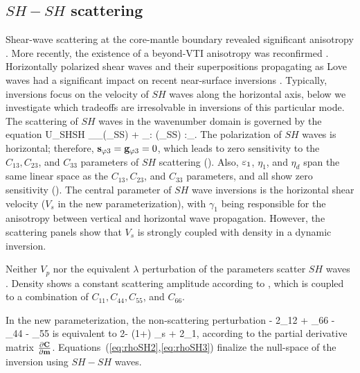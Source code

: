 \subsection{$SH-SH$ scattering}
%
Shear-wave scattering at the core-mantle boundary revealed significant anisotropy  \citep{fukao1984,silver1991,babuska1991,vinnik1992}. More recently, the existence of a beyond-VTI anisotropy was reconfirmed \citep{wookey2005}. Horizontally polarized shear waves and their superpositions propagating as Love waves had a significant impact on recent near-surface inversions \citep{pan2015,dokter2017}. Typically, inversions focus on the velocity of $SH$ waves along the horizontal axis, below we investigate which tradeoffs are irresolvable in inversions of this particular mode.
%
The scattering of $SH$ waves in the wavenumber domain is governed by the equation
\beq \label{eq:USHSH}
\delta U_{SHSH} \equiv   
\sv_\phi \cdot \gv_\phi \delta \hat{\rho}(\Kv_{SS}) + 
%
\sv\sv_\phi : \delta \hat{\cv}(\Kv_{SS}) :\gv\gv_{\phi}.
\eeq 
The polarization of $SH$ waves is horizontal; therefore, $\mathbf{s}_{\varphi 3} = \mathbf{g}_{\varphi 3} = 0$, which leads to zero sensitivity to  the $C_{13}, C_{23}$, and $C_{33}$ parameters of $SH$ scattering (). Also, $\varepsilon_1$, $\eta_1$, and $\eta_d$ span the same linear space as the $C_{13}, C_{23}$, and $C_{33}$ parameters, and all show zero sensitivity (). 
The central parameter of $SH$ wave inversions is the horizontal shear velocity ($V_s$ in the new parameterization), with $\gamma_1$ being responsible for the anisotropy between vertical and horizontal wave propagation. However, the scattering panels  show that $V_s$ is strongly coupled with density in a dynamic inversion.

Neither $V_p$ nor the equivalent $\lambda$ perturbation of the parameters scatter $SH$ waves \citep{wu1985}. Density shows a constant scattering amplitude according to , which is coupled to a combination of $C_{11},C_{44},C_{55}$, and $C_{66}$.




In the new parameterization, the non-scattering perturbation
\beq \label{eq:rhoSH2}
\rhov - 2\Cv_{12} + \Cv_{66} - \Cv_{44} - \Cv_{55} 
\eeq
is equivalent to
\beq \label{eq:rhoSH3}
2\varkappa \rhov - (1+\varkappa) \Vv_s + 2\gammav_1,
\eeq
according to the partial derivative matrix $\frac{\partial \mathbf{C}}{\partial \mathbf{m}}$.
Equations~(\ref{eq:rhoSH2},\ref{eq:rhoSH3}) finalize the null-space of the inversion using $SH-SH$ waves.


